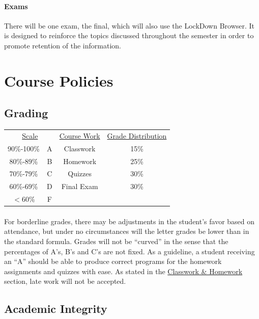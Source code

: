 \documentclass[letter,11pt]{article}
\begin{document}
\paragraph{Exams}There will be one exam, the final, which will also use the LockDown Browser. It is designed to reinforce the topics discussed throughout the semester in order to promote retention of the information.

\section*{Course Policies}
\subsection*{Grading}

\begin{center}
\begin{tabular}{ c c || c c}
\multicolumn{2}{c||}{\underline{Scale}} & \underline{Course Work} & \underline{Grade Distribution} \\
90\%-100\% & A & Classwork & 15\% \\
80\%-89\% & B & Homework & 25\% \\
70\%-79\% & C & Quizzes & 30\% \\ 
60\%-69\% & D & Final Exam & 30\% \\
$<$60\%     & F & 
\end{tabular}
\end{center}

\paragraph{}For borderline grades, there may be adjustments in the student's favor based on attendance, but under no circumstances will the letter grades be lower than in the standard formula. Grades will not be ``curved'' in the sense that the percentages of A's, B's and C's are not fixed. As a guideline, a student receiving an ``A'' should be able to produce correct programs for the homework assignments and quizzes with ease. As stated in the \hyperlink{cwhw}{Classwork \& Homework} section, late work will not be accepted.

\subsection*{Academic Integrity}
\end{document}
